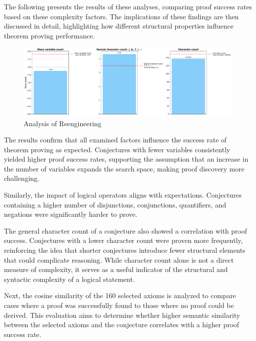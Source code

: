 \documentclass[english,version-2020-11]{uzl-thesis}
\begin{document}
The following presents the results of these analyses, comparing proof success rates based on these complexity factors. The implications of these findings are then discussed in detail, highlighting how different structural properties influence theorem proving performance.


\begin{figure}[h!]
    \centering
    \includegraphics[width=\textwidth]{combined_graphs.pdf}
    \caption{Analysis of Reengineering}
    \label{fig:analysis_reeingieering}
\end{figure}
\FloatBarrier

The results confirm that all examined factors influence the success rate of theorem proving as expected. Conjectures with fewer variables consistently yielded higher proof success rates, supporting the assumption that an increase in the number of variables expands the search space, making proof discovery more challenging.

Similarly, the impact of logical operators aligns with expectations. Conjectures containing a higher number of disjunctions, conjunctions, quantifiers, and negations were significantly harder to prove.

The general character count of a conjecture also showed a correlation with proof success. Conjectures with a lower character count were proven more frequently, reinforcing the idea that shorter conjectures introduce fewer structural elements that could complicate reasoning. While character count alone is not a direct measure of complexity, it serves as a useful indicator of the structural and syntactic complexity of a logical statement.

Next, the cosine similarity of the 160 selected axioms is analyzed to compare cases where a proof was successfully found to those where no proof could be derived. This evaluation aims to determine whether higher semantic similarity between the selected axioms and the conjecture correlates with a higher proof success rate.
\end{document}
